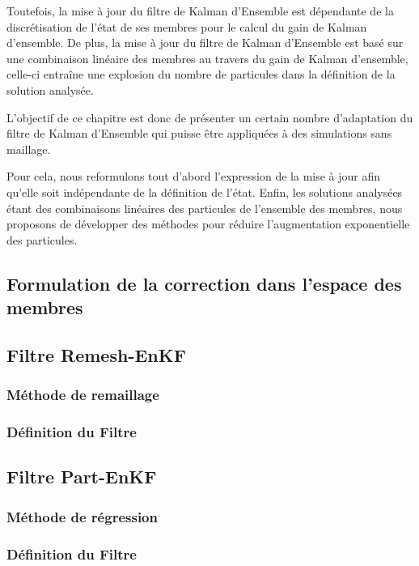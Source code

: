 \begin{itemize}
Toutefois, la mise à jour du filtre de Kalman d'Ensemble est dépendante de la discrétisation de l'état de ses membres pour le calcul du gain de Kalman d'ensemble. De plus, la mise à jour du filtre de Kalman d'Ensemble est basé sur une combinaison linéaire des membres au travers du gain de Kalman d'ensemble, celle-ci entraîne une explosion du nombre de particules dans la définition de la solution analysée.

L'objectif de ce chapitre est donc de présenter un certain nombre d'adaptation du filtre de Kalman d'Ensemble qui puisse être appliquées à des simulations sans maillage.

Pour cela, nous reformulons tout d'abord l'expression de la mise à jour afin qu'elle soit indépendante de la définition de l'état.
Enfin, les solutions analysées étant des combinaisons linéaires des particules de l'ensemble des membres, nous proposons de développer des méthodes pour réduire l'augmentation exponentielle des particules.

\subsection{Formulation de la correction dans l'espace des membres}

\subsection{Filtre Remesh-EnKF}
\subsubsection{Méthode de remaillage}
\subsubsection{Définition du Filtre}
\subsection{Filtre Part-EnKF}
\subsubsection{Méthode de régression}
\subsubsection{Définition du Filtre}

\subsubsection{}


\end{itemize}
